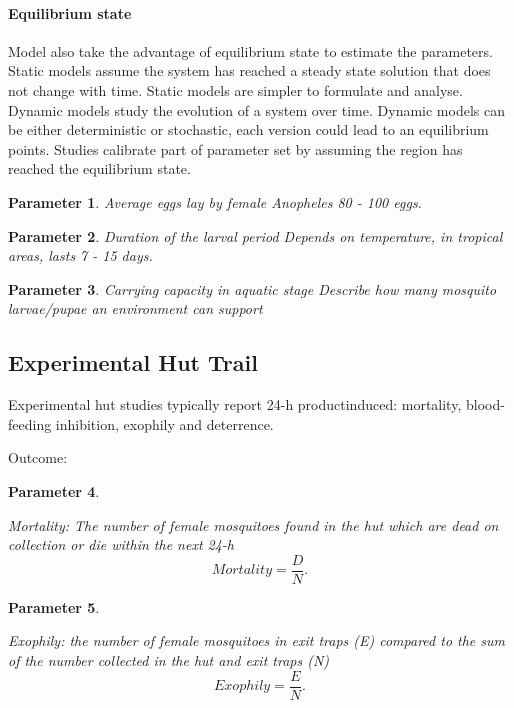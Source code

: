 \documentclass[a4paper, 12pt, twoside]{article}
\newtheorem{parameter}{Parameter}
\begin{document}
\paragraph{Equilibrium state}%
\label{par:equilibrium_state}
Model also take the advantage of equilibrium state to estimate the parameters\cite{Alves2021}.
Static models assume the system has reached a steady state solution that does not change with time.
Static models are simpler to formulate and analyse.
Dynamic models study the evolution of a system over time.
Dynamic models can be either deterministic or stochastic, each version could lead to an equilibrium points.
Studies calibrate part of parameter set by assuming the region has reached the equilibrium state.

\begin{parameter}
	{Average eggs lay by female \textit{Anopheles}}
	80 - 100 eggs.
\end{parameter}

\begin{parameter}
	{Duration of the larval period}
	Depends on temperature, in tropical areas, lasts 7 - 15 days.\cite{bayoh_lindsay_2003}
\end{parameter}

\begin{parameter}
	{Carrying capacity in aquatic stage}
	Describe how many mosquito larvae/pupae an environment can support
\end{parameter}

\subsection{Experimental Hut Trail}
Experimental hut studies typically report 24-h productinduced: mortality, blood-feeding inhibition, exophily and deterrence.

Outcome:

\begin{parameter}
	\label{eht:mortality}

	Mortality: The number of female mosquitoes found in the hut which are dead on collection or die within the next 24-h
	\[
		Mortality = \frac{D}{N}
		.\]
\end{parameter}


\begin{parameter}
	\label{eht:exophily}

	Exophily: the number of female mosquitoes in exit traps (E) compared to the sum of the number collected in the hut and exit traps (N)
	\[
		Exophily = \frac{E}{N}
		.\]

\end{parameter}
\end{document}
